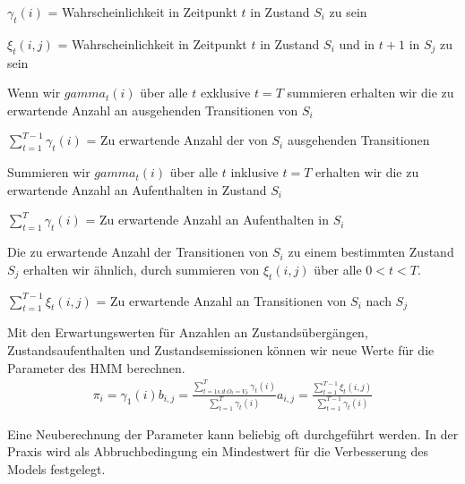 $\gamma_t(i)$ = Wahrscheinlichkeit in Zeitpunkt $t$ in Zustand $S_i$ zu sein

$\xi_t(i, j)$ = Wahrscheinlichkeit in Zeitpunkt $t$ in Zustand $S_i$ und in $t+1$ in $S_j$ zu sein

Wenn wir $gamma_t(i)$ über alle $t$ exklusive $t=T$ summieren erhalten wir die zu erwartende Anzahl an ausgehenden Transitionen von $S_i$

$\sum_{t=1}^{T-1} \gamma_t(i)$ = Zu erwartende Anzahl der von $S_i$ ausgehenden Transitionen

Summieren wir $gamma_t(i)$ über alle $t$ inklusive $t=T$ erhalten wir die zu erwartende Anzahl an Aufenthalten in
Zustand $S_i$

$\sum_{t=1}^{T} \gamma_t(i)$ = Zu erwartende Anzahl an Aufenthalten in $S_i$

Die zu erwartende Anzahl der Transitionen von $S_i$ zu einem bestimmten Zustand $S_j$ erhalten 
wir ähnlich, durch summieren von $\xi_t(i, j)$ über alle $0 < t < T$.

$\sum_{t=1}^{T-1} \xi_t(i, j)$ = Zu erwartende Anzahl an Transitionen von $S_i$ nach $S_j$

Mit den Erwartungswerten für Anzahlen an Zustandsübergängen, Zustandsaufenthalten und Zustandsemissionen können wir neue Werte für die Parameter des HMM berechnen.
\begin{align*}
\pi_i = \gamma_1(i)
b_{i,j} = \frac{\sum_{t=1 s.d. O_t= V_k}^{T} \gamma_t(i)}{\sum_{t=1}^{T} \gamma_t(i)}
a_{i,j} = \frac{\sum_{t=1}^{T-1} \xi_t(i, j)}{\sum_{t=1}^{T-1} \gamma_t(i)}
\end{align*}

Eine Neuberechnung der Parameter kann beliebig oft durchgeführt werden.
In der Praxis wird als Abbruchbedingung ein Mindestwert für die Verbesserung des Models festgelegt.